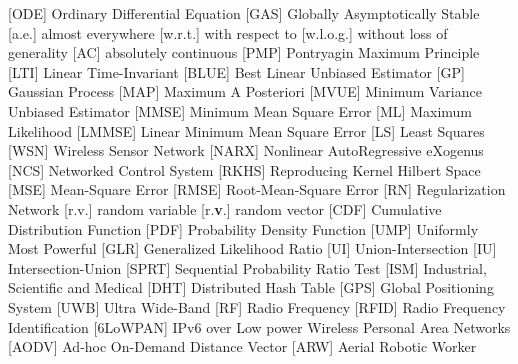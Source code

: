        [ODE]           {Ordinary Differential Equation}
       [GAS]           {Globally Asymptotically Stable}
        [a.e.]          {almost everywhere}
       [w.r.t.]        {with respect to}
      [w.l.o.g.]      {without loss of generality}
        [AC]            {absolutely continuous}
       [PMP]           {Pontryagin Maximum Principle}
       [LTI]           {Linear Time-Invariant}
      [BLUE]          {Best Linear Unbiased Estimator}
        [GP]            {Gaussian Process}
       [MAP]           {Maximum A Posteriori}
      [MVUE]          {Minimum Variance Unbiased Estimator}
      [MMSE]          {Minimum Mean Square Error}
        [ML]            {Maximum Likelihood}
     [LMMSE]         {Linear Minimum Mean Square Error}
        [LS]            {Least Squares}
       [WSN]           {Wireless Sensor Network}
      [NARX]          {Nonlinear AutoRegressive eXogenus}
       [NCS]           {Networked Control System}
      [RKHS]          {Reproducing Kernel Hilbert Space}
       [MSE]           {Mean-Square Error}
      [RMSE]          {Root-Mean-Square Error}
        [RN]            {Regularization Network}
        [r.v.]          {random variable}
       [r.\textbf{v}.] {random vector}
       [CDF]           {Cumulative Distribution Function}
       [PDF]           {Probability Density Function}
       [UMP]           {Uniformly Most Powerful}
       [GLR]           {Generalized Likelihood Ratio}
        [UI]            {Union-Intersection}
        [IU]            {Intersection-Union}
      [SPRT]          {Sequential Probability Ratio Test}
       [ISM]           {Industrial, Scientific and Medical}
       [DHT]           {Distributed Hash Table}
       [GPS]           {Global Positioning System}
       [UWB]           {Ultra Wide-Band}
        [RF]            {Radio Frequency}
      [RFID]          {Radio Frequency Identification}
   [6LoWPAN]       {IPv6 over Low power Wireless Personal Area Networks}
      [AODV]          {Ad-hoc On-Demand Distance Vector}
       [ARW]           {Aerial Robotic Worker}
